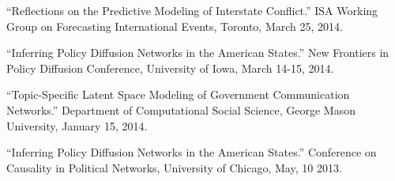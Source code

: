 \documentclass[overlapped,line]{res}
\begin{document}
\begin{resume}
\begin{etaremune}
\item ``Reflections on the Predictive Modeling of Interstate Conflict.'' ISA Working Group on Forecasting International Events, Toronto, March 25, 2014.
\item ``Inferring Policy Diffusion Networks in the American States.'' New Frontiers in Policy Diffusion Conference, University of  Iowa,  March 14-15, 2014.
\item  ``Topic-Specific Latent Space Modeling of Government Communication Networks.'' Department of Computational Social Science, George Mason University, January 15, 2014.
\item ``Inferring Policy Diffusion Networks in the American States.'' Conference on Causality in Political Networks, University of Chicago, May, 10 2013.
\end{etaremune}


\end{resume}
\end{document}

